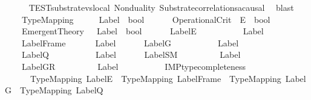 \begin{isabellebody}
%
\isadelimproof
\ \ \ \ %
\endisadelimproof
%
\isatagproof
{}\isamarkupfalse%
\ TEST{}{\isacharunderscore}{\kern0pt}substrate{\isacharunderscore}{\kern0pt}vs{\isacharunderscore}{\kern0pt}local\ Nonduality\ Substrate{\isacharunderscore}{\kern0pt}correlations{\isacharunderscore}{\kern0pt}acausal\ \isamarkupfalse%
\ blast%
\endisatagproof
{\isafoldproof}%
%
\isadelimproof
%
\endisadelimproof
%
\isadelimdocument
%
\endisadelimdocument
%
\isatagdocument
%
\isamarkuptrue%
%
\endisatagdocument
{\isafolddocument}%
%
\isadelimdocument
%
\endisadelimdocument
\ \ \isamarkupfalse%
\isanewline
\ \ \ \ TypeMapping\ \ \ \ \ {\isacharcolon}{\kern0pt}{\isacharcolon}{\kern0pt}\ {\isachardoublequoteopen}Label\ {\isasymRightarrow}\ bool{\isachardoublequoteclose}\ \ \isanewline
\ \ \ \ OperationalCrit\ {\isacharcolon}{\kern0pt}{\isacharcolon}{\kern0pt}\ {\isachardoublequoteopen}E\ {\isasymRightarrow}\ bool{\isachardoublequoteclose}\ \ \ \ \ \ \isanewline
\ \ \ \ EmergentTheory\ \ {\isacharcolon}{\kern0pt}{\isacharcolon}{\kern0pt}\ {\isachardoublequoteopen}Label\ {\isasymRightarrow}\ bool{\isachardoublequoteclose}\ \ \isanewline
\ \ \ \ LabelE\ \ \ \ \ \ \ \ \ \ {\isacharcolon}{\kern0pt}{\isacharcolon}{\kern0pt}\ {\isachardoublequoteopen}Label{\isachardoublequoteclose}\ \ \isanewline
\ \ \ \ LabelFrame\ \ \ \ \ \ {\isacharcolon}{\kern0pt}{\isacharcolon}{\kern0pt}\ {\isachardoublequoteopen}Label{\isachardoublequoteclose}\ \ \isanewline
\ \ \ \ LabelG\ \ \ \ \ \ \ \ \ \ {\isacharcolon}{\kern0pt}{\isacharcolon}{\kern0pt}\ {\isachardoublequoteopen}Label{\isachardoublequoteclose}\ \ \isanewline
\ \ \ \ LabelQ\ \ \ \ \ \ \ \ \ \ {\isacharcolon}{\kern0pt}{\isacharcolon}{\kern0pt}\ {\isachardoublequoteopen}Label{\isachardoublequoteclose}\ \ \isanewline
\ \ \ \ LabelSM\ \ \ \ \ \ \ \ \ {\isacharcolon}{\kern0pt}{\isacharcolon}{\kern0pt}\ {\isachardoublequoteopen}Label{\isachardoublequoteclose}\ \ \isanewline
\ \ \ \ LabelGR\ \ \ \ \ \ \ \ \ {\isacharcolon}{\kern0pt}{\isacharcolon}{\kern0pt}\ {\isachardoublequoteopen}Label{\isachardoublequoteclose}\ \ \isanewline
\isanewline
\ \ \isamarkupfalse%
\ \isanewline
\ \ \ \ IMP{}{\isacharunderscore}{\kern0pt}type{\isacharunderscore}{\kern0pt}completeness{\isacharcolon}{\kern0pt}\isanewline
\ \ \ \ \ \ {\isachardoublequoteopen}TypeMapping\ LabelE\ {\isasymand}\ TypeMapping\ LabelFrame\ {\isasymand}\ TypeMapping\ LabelG\ {\isasymand}\ TypeMapping\ LabelQ{\isachardoublequoteclose}\ \isanewline

\end{isabellebody}
